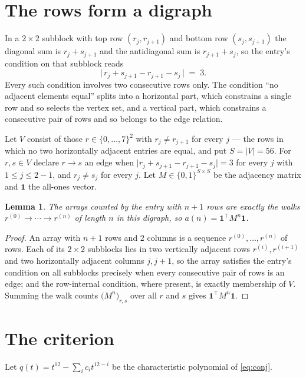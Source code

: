 \documentclass[11pt,a4paper]{article}
\theoremstyle{plain}
\newtheorem{lemma}[theorem]{Lemma}
\theoremstyle{definition}
\begin{document}
\section{The rows form a digraph}

In a $2\times2$ subblock with top row $(r_j,r_{j+1})$ and bottom row $(s_j,s_{j+1})$ the
diagonal sum is $r_j+s_{j+1}$ and the antidiagonal sum is $r_{j+1}+s_j$, so the entry's
condition on that subblock reads
\[
\bigl|\,r_j+s_{j+1}-r_{j+1}-s_j\,\bigr|\;=\;3.
\]
Every such condition involves two consecutive rows only. The condition ``no adjacent elements equal'' splits into a horizontal
part, which constrains a single row and so selects the vertex set, and a vertical part,
which constrains a consecutive pair of rows and so belongs to the edge relation.

Let $V$ consist of those $r\in\{0,\dots,7\}^{2}$ with $r_j\ne r_{j+1}$ for every
$j$ --- the rows in which no two horizontally adjacent entries are equal, and put $S=|V|=56$. For $r,s\in V$ declare $r\to s$ an edge
when $\bigl|r_j+s_{j+1}-r_{j+1}-s_j\bigr|=3$ for every $j$ with
$1\le j\le2-1$, and $r_j\ne s_j$ for every $j$. Let $M\in\{0,1\}^{S\times S}$ be the adjacency matrix and $\mathbf{1}$
the all-ones vector.

\begin{lemma}\label{lem:walk}
The arrays counted by the entry with $n+1$ rows are exactly the walks
$r^{(0)}\to\cdots\to r^{(n)}$ of length $n$ in this digraph, so
$a(n)=\mathbf{1}^{\!\top}M^{n}\mathbf{1}$.
\end{lemma}

\begin{proof}
An array with $n+1$ rows and $2$ columns is a sequence $r^{(0)},\dots,r^{(n)}$ of
rows. Each of its $2\times2$ subblocks lies in two vertically adjacent rows
$r^{(i)},r^{(i+1)}$ and two horizontally adjacent columns $j,j+1$, so the array satisfies
the entry's condition on all subblocks precisely when every consecutive pair of rows is an
edge; and the row-internal condition, where present, is exactly membership of $V$. Summing
the walk counts $\bigl(M^{n}\bigr)_{r,s}$ over all $r$ and $s$ gives
$\mathbf{1}^{\!\top}M^{n}\mathbf{1}$.
\end{proof}

\section{The criterion}

Let $q(t)=t^{12}-\sum_i c_i t^{12-i}$ be the characteristic polynomial of
\eqref{eq:conj}.
\end{document}
